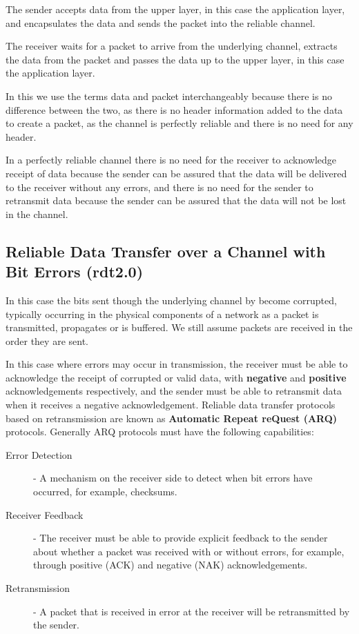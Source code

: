 \documentclass[12pt letter]{report}
\begin{document}
The sender accepts data from the upper layer, in this case the
application layer, and encapsulates the data and sends the packet
into the reliable channel.

The receiver waits for a packet to arrive from the underlying
channel, extracts the data from the packet and passes the data up to
the upper layer, in this case the application layer.

In this we use the terms data and packet interchangeably because
there is no difference between the two, as there is no header
information added to the data to create a packet, as the channel is
perfectly reliable and there is no need for any header.

In a perfectly reliable channel there is no need for the receiver to
acknowledge receipt of data because the sender can be assured that
the data will be delivered to the receiver without any errors, and
there is no need for the sender to retransmit data because the sender
can be assured that the data will not be lost in the channel.

\subsection{Reliable Data Transfer over a Channel with Bit Errors (rdt2.0)}

In this case the bits sent though the underlying channel by become
corrupted, typically occurring in the physical components of a
network as a packet is transmitted, propagates or is buffered. We
still assume packets are received in the order they are sent.



In this case where errors may occur in transmission, the receiver
must be able to acknowledge the receipt of corrupted or valid data,
with \textbf{negative} and \textbf{positive} acknowledgements
respectively, and the sender must be able to retransmit data when it
receives a negative acknowledgement. Reliable data transfer protocols
based on retransmission are known as \textbf{Automatic Repeat reQuest
(ARQ)} protocols. Generally ARQ protocols must have the following capabilities:
\begin{description}
  \item[Error Detection]  - A mechanism on the receiver side to
    detect when bit errors have occurred, for example, checksums.
  \item[Receiver Feedback] - The receiver must be able to provide
    explicit feedback to the sender about whether a packet was
    received with or without errors, for example, through positive
    (ACK) and negative (NAK) acknowledgements.
  \item[Retransmission] - A packet that is received in error at the
    receiver will be retransmitted by the sender.
\end{description}
\end{document}
